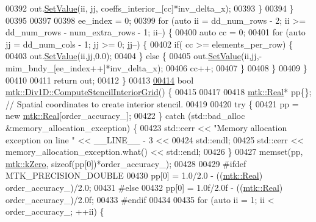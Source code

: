 \begin{DoxyCode}
{{00392       out.\hyperlink{classmtk_1_1DenseMatrix_ae0f873a6d3a734da467cafb817da64ae}{SetValue}(ii, jj, coeffs\_interior\_[cc]*inv\_delta\_x);
00393     \}
00394   \}
00395 
00397 
00398   ee\_index = 0;
00399   \textcolor{keywordflow}{for} (\textcolor{keyword}{auto} ii = dd\_num\_rows - 2; ii >= dd\_num\_rows - num\_extra\_rows - 1; ii--) \{
00400     \textcolor{keyword}{auto} cc = 0;
00401     \textcolor{keywordflow}{for} (\textcolor{keyword}{auto} jj = dd\_num\_cols - 1; jj >= 0; jj--) \{
00402       \textcolor{keywordflow}{if}( cc >= elements\_per\_row) \{
00403         out.\hyperlink{classmtk_1_1DenseMatrix_ae0f873a6d3a734da467cafb817da64ae}{SetValue}(ii,jj,0.0);
00404       \} \textcolor{keywordflow}{else} \{
00405         out.\hyperlink{classmtk_1_1DenseMatrix_ae0f873a6d3a734da467cafb817da64ae}{SetValue}(ii,jj,-mim\_bndy\_[ee\_index++]*inv\_delta\_x);
00406         cc++;
00407       \}
00408      \}
00409   \}
00410 
00411   \textcolor{keywordflow}{return} out;
00412 \}
00413 
\hypertarget{mtk__div__1d_8cc_source_l00414}{}\hyperlink{classmtk_1_1Div1D_a3eb3a32862a6b066cd583cbbd00a6509}{00414} \textcolor{keywordtype}{bool} \hyperlink{classmtk_1_1Div1D_a3eb3a32862a6b066cd583cbbd00a6509}{mtk::Div1D::ComputeStencilInteriorGrid}() \{
00415 
00417 
00418   \hyperlink{group__c01-roots_gac080bbbf5cbb5502c9f00405f894857d}{mtk::Real}* pp\{\}; \textcolor{comment}{// Spatial coordinates to create interior stencil.}
00419 
00420   \textcolor{keywordflow}{try} \{
00421     pp = \textcolor{keyword}{new} \hyperlink{group__c01-roots_gac080bbbf5cbb5502c9f00405f894857d}{mtk::Real}[order\_accuracy\_];
00422   \} \textcolor{keywordflow}{catch} (std::bad\_alloc &memory\_allocation\_exception) \{
00423     std::cerr << \textcolor{stringliteral}{"Memory allocation exception on line "} << \_\_LINE\_\_ - 3 <<
00424       std::endl;
00425     std::cerr << memory\_allocation\_exception.what() << std::endl;
00426   \}
00427   memset(pp, \hyperlink{group__c01-roots_ga59a451a5fae30d59649bcda274fea271}{mtk::kZero}, \textcolor{keyword}{sizeof}(pp[0])*order\_accuracy\_);
00428 
00429 \textcolor{preprocessor}{  #ifdef MTK\_PRECISION\_DOUBLE}
00430   pp[0] = 1.0/2.0 - ((\hyperlink{group__c01-roots_gac080bbbf5cbb5502c9f00405f894857d}{mtk::Real}) order\_accuracy\_)/2.0;
00431 \textcolor{preprocessor}{  #else}
00432   pp[0] = 1.0f/2.0f - ((\hyperlink{group__c01-roots_gac080bbbf5cbb5502c9f00405f894857d}{mtk::Real}) order\_accuracy\_)/2.0f;
00433 \textcolor{preprocessor}{  #endif}
00434 
00435   \textcolor{keywordflow}{for} (\textcolor{keyword}{auto} ii = 1; ii < order\_accuracy\_; ++ii) \{
}}
\end{DoxyCode}
